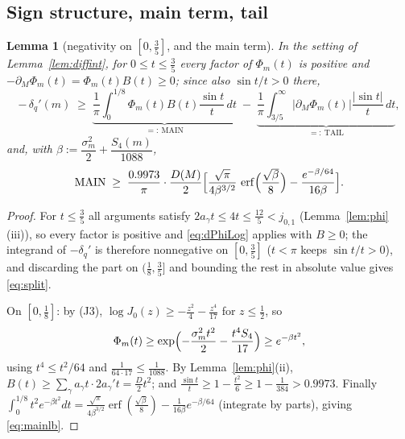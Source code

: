 \documentclass[11pt]{article}
\newtheorem{lemma}{Lemma}
\begin{document}
\subsection*{Sign structure, main term, tail}

\begin{lemma}[{negativity on $[0,\frac35]$, and the main term}]
\label{lem:negstruct}
In the setting of Lemma~\ref{lem:diffint}, for $0\le t\le\tfrac35$
every factor of $\Phi_m(t)$ is positive and
$-\partial_M\Phi_m(t)=\Phi_m(t)B(t)\ge0$; since also
$\sin t/t>0$ there,
\begin{equation}\label{eq:split}
-\,\delta_q'(m)\;\ge\;
\underbrace{\frac1\pi\int_0^{1/8}\Phi_m(t)B(t)\frac{\sin t}t\,dt}
_{=:\ \mathrm{MAIN}}
\;-\;
\underbrace{\frac1\pi\int_{3/5}^{\infty}\bigl|\partial_M\Phi_m(t)\bigr|
\frac{|\sin t|}t\,dt}_{=:\ \mathrm{TAIL}} ,
\end{equation}
and, with $\beta:=\dfrac{\sigma_m^2}2+\dfrac{S_4(m)}{1088}$,
\begin{equation}\label{eq:mainlb}
\mathrm{MAIN}\;\ge\;\frac{0.9973}{\pi}\cdot\frac{D(M)}2
\Bigl[\frac{\sqrt\pi}{4\beta^{3/2}}\,
\operatorname{erf}\Bigl(\frac{\sqrt\beta}8\Bigr)
-\frac{e^{-\beta/64}}{16\beta}\Bigr].
\end{equation}
\end{lemma}

\begin{proof}
For $t\le\tfrac35$ all arguments satisfy
$2a_\gamma t\le4t\le\tfrac{12}5<j_{0,1}$
(Lemma~\ref{lem:phi}(iii)), so every factor is positive and
\eqref{eq:dPhiLog} applies with $B\ge0$; the integrand of
$-\delta_q'$ is therefore nonnegative on $[0,\tfrac35]$
($t<\pi$ keeps $\sin t/t>0$), and discarding the part on
$(\tfrac18,\tfrac35]$ and bounding the rest in absolute value gives
\eqref{eq:split}.

On $[0,\tfrac18]$: by (J3),
$\log J_0(z)\ge-\tfrac{z^2}4-\tfrac{z^4}{17}$ for $z\le\tfrac12$, so
\[
\Phi_m(t)\ge\exp\Bigl(-\frac{\sigma_m^2t^2}2-\frac{t^4S_4}{17}\Bigr)
\ge e^{-\beta t^2},
\]
using $t^4\le t^2/64$ and $\tfrac1{64\cdot17}\le\tfrac1{1088}$. By
Lemma~\ref{lem:phi}(ii), $B(t)\ge\sum_\gamma a_\gamma t\cdot
2a_\gamma't=\tfrac D2t^2$; and $\tfrac{\sin t}t\ge1-\tfrac{t^2}6
\ge1-\tfrac1{384}>0.9973$. Finally
$\int_0^{1/8}t^2e^{-\beta t^2}dt
=\frac{\sqrt\pi}{4\beta^{3/2}}\operatorname{erf}(\tfrac{\sqrt\beta}8)
-\frac1{16\beta}e^{-\beta/64}$ (integrate by parts), giving
\eqref{eq:mainlb}.
\end{proof}
\end{document}
